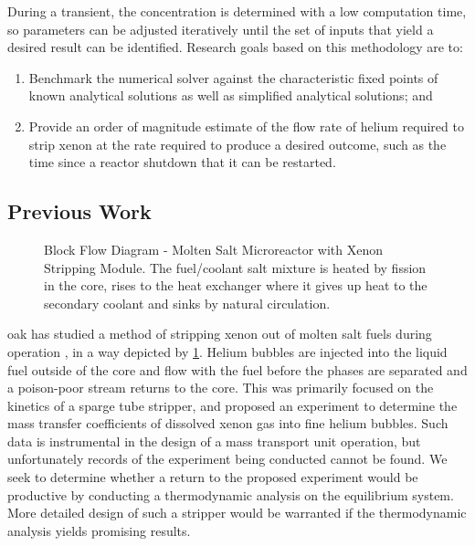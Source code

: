 During a transient, the \Xe concentration is determined with a low computation time, so parameters can be adjusted iteratively until the set of inputs that yield a desired result can be identified. Research goals based on this methodology are to:
\begin{enumerate}[topsep=3pt,itemsep=-0.75ex,partopsep=1ex,parsep=1ex,label=(\arabic*)]
    \item Benchmark the numerical solver against the characteristic fixed points of known analytical solutions as well as simplified analytical solutions; and
    \item Provide an order of magnitude estimate of the flow rate of helium required to strip xenon at the rate required to produce a desired outcome, such as the time since a reactor shutdown that it can be restarted.
\end{enumerate}

\subsection{Previous Work}
\begin{figure}[!ht]\centering
    
    \caption[Block Flow Diagram - Molten Salt Microreactor with Xenon Stripping Module]{Block Flow Diagram - Molten Salt Microreactor with Xenon Stripping Module. The fuel/coolant salt mixture is heated by fission in the core, rises to the heat exchanger where it gives up heat to the secondary coolant and sinks by natural circulation. }
    \label{fig:BFD}
\end{figure}

\acf{oak} has studied a method of stripping xenon out of molten salt fuels during operation \cite{ORNL-masstransport}, in a way depicted by \cref{fig:BFD}. Helium bubbles are injected into the liquid fuel outside of the core and flow with the fuel before the phases are separated and a poison-poor stream returns to the core. This was primarily focused on the kinetics of a sparge tube stripper, and proposed an experiment to determine the mass transfer coefficients of dissolved xenon gas into fine helium bubbles. Such data is instrumental in the design of a mass transport unit operation, but unfortunately records of the experiment being conducted cannot be found. We seek to determine whether a return to the proposed experiment would be productive by conducting a thermodynamic analysis on the equilibrium system. More detailed design of such a stripper would be warranted if the thermodynamic analysis yields promising results.


